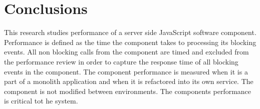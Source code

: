 \chapter{Conclusions\label{conclusions}}
This research studies performance of a server side JavaScript software component.
Performance is defined as the time the component takes to processing its blocking events.
All non blocking calls from the component are timed and excluded from the performance review in order to capture the response time of all blocking events in the component.
The component performance is measured when it is a part of a monolith application and when it is refactored into its own service.
The component is not modified between environments.
The components performance is critical tot he system.